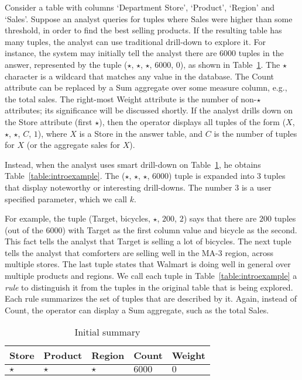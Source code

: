 \begin{example}\label{ex:introexample}
Consider a table with columns `Department Store', `Product', `Region'
and `Sales'. Suppose an analyst queries for tuples
where Sales were higher than some threshold, in order
to find the best selling products.
If the resulting table has many tuples,
the analyst can use traditional drill-down to explore it.
For instance, the system may initially tell the analyst there are
6000 tuples in the answer, represented by the tuple ($\star$, $\star$, $\star$, $6000$, $0$),
as shown in Table~\ref{table:introexample0}.
The $\star$ character is a wildcard that matches any value in the database.
The Count attribute can be replaced by a Sum aggregate over some measure column,
e.g., the total sales.
The right-most Weight attribute is the number of non-$\star$ attributes; 
its significance will be discussed shortly.
If the analyst drills down on the Store attribute (first $\star$),
then the operator displays all tuples of the form ($X$, $\star$, $\star$, $C$, $1$),
where $X$ is a Store in the answer table, and $C$
is the number of tuples for $X$ (or the aggregate sales for $X$).

Instead, when the analyst uses smart drill-down on Table~\ref{table:introexample0},
he obtains Table~\ref{table:introexample}.
The ($\star$, $\star$, $\star$, $6000$) tuple is expanded into $3$ tuples
that display noteworthy or interesting drill-downs.
The number $3$ is a user specified parameter, which we call $k$.

For example, the tuple (Target, bicycles, $\star$, $200$, $2$)
says that there are $200$ tuples (out of the 6000) with
Target as the first column value and bicycle as the second.
This fact tells the analyst that Target is selling a lot of bicycles.
The next tuple tells the analyst that comforters are selling well in
the MA-3 region, across multiple stores. The last tuple
states that Walmart is doing well in general over multiple products and regions.
We call each tuple in Table~\ref{table:introexample} a {\em rule}
to distinguish it from the tuples in the original table that is being explored.
Each rule summarizes the set of tuples that are described by it.
Again, instead of Count, the operator can display a Sum aggregate, such as
the total Sales.

\begin{table}
\scriptsize
\centering
\begin{tabular}{| l | l | l | l | l |}
\hline Store & Product & Region & Count & Weight \\
\hline
$\star$ & $\star$ & $\star$ & $6000$ & $0$ \\ \hline
\end{tabular}
\vspace{-10pt}
\caption{Initial summary}\label{table:introexample0}
\vspace{-5pt}
\end{table}


\end{example}
